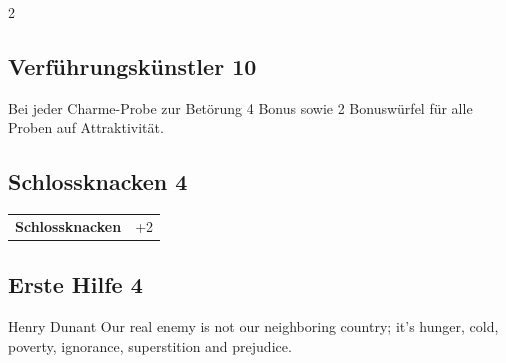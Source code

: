 \begin{multicols}{2}
\begin{tcolorbox}
\vspace{3mm}



\end{tcolorbox}

\begin{tcolorbox}
    \subsection*{Verführungskünstler \hfill \small{10 }}
    \tcblower
Bei jeder Charme-Probe zur Betörung 4 Bonus sowie 2 Bonuswürfel für alle Proben auf Attraktivität.


\vspace{3mm}



\end{tcolorbox}

\begin{tcolorbox}
    \subsection*{Schlossknacken \hfill \small{4 }}
    \tcblower




\begin{tabular}{@{}ll@{}}
    \textbf{Schlossknacken} & +2\\
\end{tabular}


\end{tcolorbox}

\begin{tcolorbox}
    \subsection*{Erste Hilfe \hfill \small{4 }}
    \tcblower


\begin{pquote}{Henry Dunant}
Our real enemy is not our neighboring country; it's hunger, cold, poverty, ignorance, superstition and prejudice.
\end{pquote}


\end{tcolorbox}
\end{multicols}

